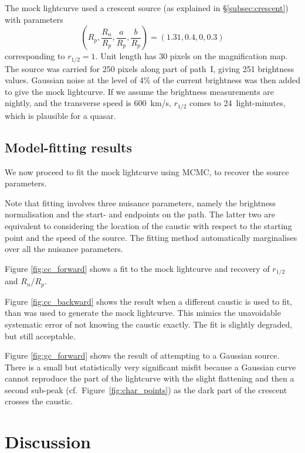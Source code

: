 \documentclass[usenatbib]{mn2e}
\begin{document}
The mock lightcurve used a crescent source (as explained in
\S\ref{subsec:crescent}) with parameters
\begin{equation}
   \left(R_p, \frac{R_n}{R_p}, \frac{a}{R_p}, \frac{b}{R_p}\right) =
   (1.31, 0.4, 0, 0.3)
\label{eqn:cp}
\end{equation}
corresponding to $r_{1/2}=1$.  Unit length has 30 pixels on the
magnification map.  The source was carried for 250 pixels along part
of path~I, giving 251 brightness values.  Gaussian noise at the level
of 4\% of the current brightness was then added to give the mock
lightcurve.  If we assume the brightness measurements are nightly, and
the transverse speed is 600~km/s, $r_{1/2}$ comes to 24~light-minutes,
which is plausible for a quasar.

\subsection{Model-fitting results}

We now proceed to fit the mock lightcurve using MCMC, to recover the
source parameters.

Note that fitting involves three nuisance parameters, namely the
brightness normalisation and the start- and endpoints on the path.
The latter two are equivalent to considering the location of the
caustic with respect to the starting point and the speed of the
source.  The fitting method automatically marginalises over all the
nuisance parameters.

Figure \ref{fig:cc_forward} shows a fit to the mock lightcurve and
recovery of $r_{1/2}$ and $R_n/R_p$.

Figure \ref{fig:cc_backward} shows the result when a different caustic
is used to fit, than was used to generate the mock lightcurve.  This
mimics the unavoidable systematic error of not knowing the caustic
exactly.  The fit is slightly degraded, but still acceptable.

Figure \ref{fig:gc_forward} shows the result of attempting to a
Gaussian source.  There is a small but statistically very significant
misfit because a Gaussian curve cannot reproduce the part of the
lightcurve with the slight flattening and then a second sub-peak
(cf.~Figure~\ref{fig:char_points}) as the dark part of the crescent
crosses the caustic.

\section{Discussion}\label{sec:discussion}
\end{document}
